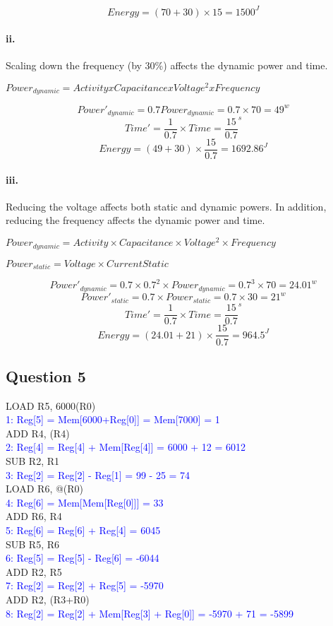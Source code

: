\documentclass[11pt]{article}
\newcommand{\q}[1]{\subsection*{Question {#1}}}
\renewcommand{\part}[1]{\paragraph*{{#1}.}}
\newcommand{\answr}[1]{\textcolor{blue}{#1}}
\newcommand{\inst}[2]{\textcolor{blue}{{#1}{#2}}}
\begin{document}
\[
Energy = (70 + 30) \times 15 = 1500 ^J
\]

\part{ii} Scaling down the frequency (by 30\%) affects the dynamic power and time. 

$Power_{dynamic} = Activity x Capacitance x Voltage^2 x Frequency$

\[
Power'_{dynamic} = 0.7 Power_{dynamic} = 0.7 \times 70 = 49^w
\]
\[
Time' = \frac{1}{0.7} \times Time = \frac{15}{0.7}^s
\]
\[
Energy = (49 + 30) \times \frac{15}{0.7} = 1692.86 ^J
\]

\part{iii} Reducing the voltage affects both static and dynamic powers. In addition,  
reducing the frequency affects the dynamic power and time. 

$Power_{dynamic} = Activity \times Capacitance \times Voltage^2 
\times Frequency$

$Power_{static} = Voltage \times CurrentStatic$

\[
Power'_{dynamic} = 0.7 \times 0.7^2 \times Power_{dynamic} = 
0.7^3 \times 70 = 24.01^w
\]
\[
Power'_{static} = 0.7 \times Power_{static} = 0.7 \times 30 = 21^w
\]
\[
Time' = \frac{1}{0.7} \times Time = \frac{15}{0.7}^s
\]
\[
Energy = (24.01 + 21) \times \frac{15}{0.7} = 964.5^J 
\]


\q{5}

LOAD R5,  6000(R0) \\
\inst{1}{:} \answr{Reg[5] = Mem[6000+Reg[0]] = Mem[7000] = 1} \\
ADD R4, (R4) \\
\inst{2}{:} \answr{Reg[4] = Reg[4] + Mem[Reg[4]] = 6000 + 12 = 6012} \\
SUB R2, R1 \\
\inst{3}{:} \answr{Reg[2] = Reg[2] - Reg[1] = 99 - 25 = 74} \\
LOAD R6, @(R0) \\
\inst{4}{:} \answr{Reg[6] = Mem[Mem[Reg[0]]] = 33} \\
ADD R6, R4 \\
\inst{5}{:} \answr{Reg[6] = Reg[6] + Reg[4] = 6045} \\
SUB R5, R6 \\
\inst{6}{:} \answr{Reg[5] = Reg[5] - Reg[6] = -6044} \\
ADD R2, R5 \\
\inst{7}{:} \answr{Reg[2] = Reg[2] + Reg[5] = -5970} \\
ADD R2, (R3+R0) \\
\inst{8}{:} \answr{Reg[2] = Reg[2] + Mem[Reg[3] + Reg[0]] = -5970 + 71 = -5899}
\end{document}
